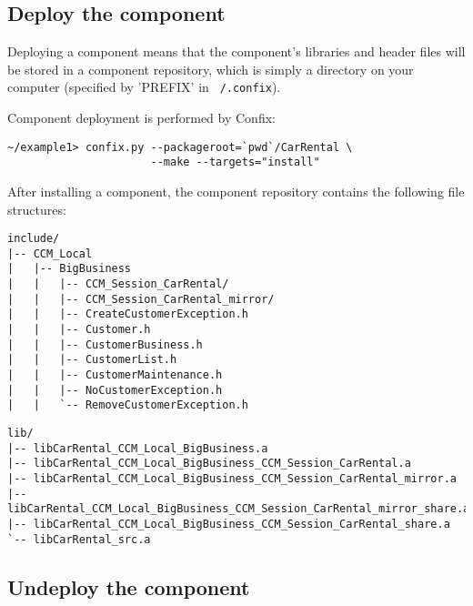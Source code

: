 \subsection{Deploy the component}

Deploying a component means that the component's libraries and header files will 
be stored in a component repository, which is simply a directory on your computer
(specified by 'PREFIX' in {\tt ~/.confix}).

Component deployment is performed by Confix:
\begin{small}
\begin{verbatim}
~/example1> confix.py --packageroot=`pwd`/CarRental \
                      --make --targets="install"
\end{verbatim}
\end{small}

After installing a component, the component repository contains the following
file structures:
\begin{small}
\begin{verbatim}
include/
|-- CCM_Local
|   |-- BigBusiness
|   |   |-- CCM_Session_CarRental/
|   |   |-- CCM_Session_CarRental_mirror/
|   |   |-- CreateCustomerException.h
|   |   |-- Customer.h
|   |   |-- CustomerBusiness.h
|   |   |-- CustomerList.h
|   |   |-- CustomerMaintenance.h
|   |   |-- NoCustomerException.h
|   |   `-- RemoveCustomerException.h
\end{verbatim}
\end{small}

\begin{small}
\begin{verbatim}
lib/
|-- libCarRental_CCM_Local_BigBusiness.a
|-- libCarRental_CCM_Local_BigBusiness_CCM_Session_CarRental.a
|-- libCarRental_CCM_Local_BigBusiness_CCM_Session_CarRental_mirror.a
|-- libCarRental_CCM_Local_BigBusiness_CCM_Session_CarRental_mirror_share.a
|-- libCarRental_CCM_Local_BigBusiness_CCM_Session_CarRental_share.a
`-- libCarRental_src.a
\end{verbatim}
\end{small}




\subsection{Undeploy the component}

